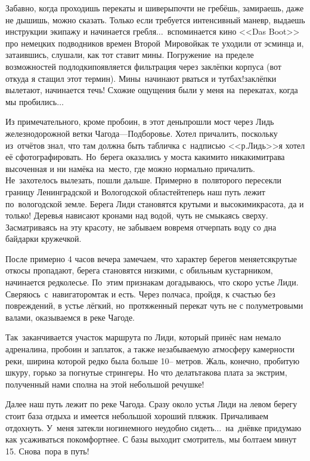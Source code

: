 Забавно, когда проходишь перекаты и шиверы\mdash почти не гребёшь, замираешь, даже не дышишь, можно сказать. Только если требуется интенсивный маневр, выдаешь инструкции экипажу и начинается гребля$\ldots$~вспоминается кино <<Das Boot>> про немецких подводников времен Второй~Мировой\mdash как те уходили от эсминца и, затаившись, слушали, как тот ставит мины. Погружение~на пределе возможностей подлодки\mdash появляется фильтрация через заклёпки корпуса (вот откуда я стащил этот термин). Мины~начинают рваться и тут\mdash бах!\mdash заклёпки вылетают, начинается течь! Схожие ощущения были у меня на~перекатах, когда мы пробились$\ldots$

Из примечательного, кроме пробоин, в этот день\mdash прошли мост через Лидь железнодорожной ветки Чагода\thinspace\nobreakdash---\thinspace Подборовье. Хотел причалить, поскольку из~отчётов знал, что там должна быть табличка с~надписью <<р.\thinspace Лидь>>\mdash я хотел её сфотографировать. Но~берега оказались у моста какими\sdash то никакими\mdash трава высоченная и ни намёка на~место, где можно нормально причалить. Не~захотелось вылезать, пошли дальше. Примерно в~полвторого пересекли границу Ленинградской и Вологодской областей\mdash теперь наш путь лежит по~вологодской земле. Берега Лиди становятся крутыми и высокими\mdash красота, да и только! Деревья нависают кронами над водой, чуть не смыкаясь сверху. Засматриваясь на эту красоту, не забываем вовремя отчерпать воду со дна байдарки кружечкой.

После примерно 4 часов вечера замечаем, что характер берегов меняется\mdash крутые откосы пропадают, берега становятся низкими, с обильным кустарником, начинается редколесье. По~этим признакам догадываюсь, что скоро устье Лиди. Сверяюсь~с~навигатором\mdash так и есть. Через полчаса, пройдя, к счастью без повреждений, в устье лёгкий, но~протяженный перекат чуть не с полуметровыми валами, оказываемся в реке Чагоде. 

Так~заканчивается участок маршрута по Лиди, который принёс нам немало адреналина, пробоин и заплаток, а также незабываемую атмосферу камерности реки, ширина которой редко была больше 10\thinspace-- метров. Жаль, конечно, пробитую шкуру, горько за погнутые стрингеры. Но что делать\mdash такова плата за экстрим, полученный нами сполна на этой небольшой речушке! 

Далее наш путь лежит по реке Чагода. Сразу около устья Лиди на левом берегу стоит база отдыха и имеется небольшой хороший пляжик. Причаливаем отдохнуть. У~меня затекли ноги\mdash немного неудобно сидеть$\ldots$~на~днёвке придумаю как усаживаться покомфортнее. С базы выходит смотритель, мы болтаем минут 15. Снова~пора в путь! 

